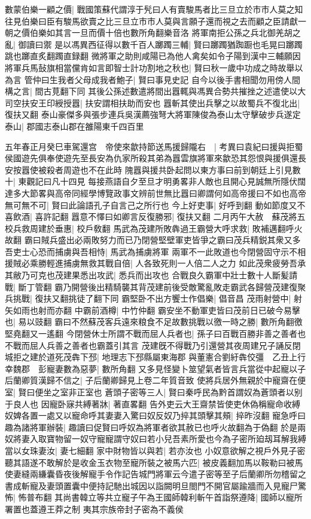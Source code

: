 數蒙伯樂一顧之價|{
	戰國策蘇代謂淳于髠曰人有賣駿馬者比三旦立於市市人莫之知往見伯樂曰臣有駿馬欲賣之比三旦立市市人莫與言願子還而視之去而顧之臣請獻一朝之價伯樂如其言一旦而價十倍也數所角翻樂音洛}
將軍南拒公孫之兵北御羌胡之亂|{
	御讀曰禦}
是以馮異西征得以數千百人躑躅三輔|{
	賢曰躑躅猶踟蹰也毛晃曰躑躅跳也躑直炙翻躅直録翻}
微將軍之助則咸陽已為他人禽矣如令子陽到漢中三輔願因將軍兵馬鼔旗相當儻肯如言即智士計功割地之秋也|{
	賢曰秋一歲中功成之時故舉以為言}
管仲曰生我者父母成我者鮑子|{
	賢曰事見史記}
自今以後手書相聞勿用傍人間構之言|{
	間古莧翻下同}
其後公孫述數遣將間出囂輒與馮異合勢共摧挫之述遣使以大司空扶安王印綬授囂|{
	扶安謂相扶助而安也}
囂斬其使出兵擊之以故蜀兵不復北出|{
	復扶又翻}
泰山豪傑多與張步連兵吳漢薦強弩大將軍陳俊為泰山太守擊破步兵遂定泰山|{
	郡國志泰山郡在雒陽東千四百里}


五年春正月癸巳車駕還宫　帝使來歙持節送馬援歸隴右　|{
	考異曰袁紀曰援與拒蜀侯國遊先俱奉使遊先至長安為仇家所殺其弟為囂雲旗將軍來歙恐其怨恨與援俱還長安按囂使被殺者周遊也不在此時}
隗囂與援共卧起問以東方事曰前到朝廷上引見數十|{
	東觀記曰凡十四見}
每接燕語自夕至旦才明勇畧非人敵也且開心見誠無所隱伏闊達多大節畧與高帝同經學博覽政事文辨前世無比囂曰卿謂何如高帝援曰不如也高帝無可無不可|{
	賢曰此論語孔子自言己之所行也}
今上好吏事|{
	好呼到翻}
動如節度又不喜飲酒|{
	喜許記翻}
囂意不懌曰如卿言反復勝邪|{
	復扶又翻}
二月丙午大赦　蘇茂將五校兵救周建於垂惠|{
	校戶敎翻}
馬武為茂建所敗犇過王霸營大呼求救|{
	敗補邁翻呼火故翻}
霸曰賊兵盛出必兩敗努力而已乃閉營堅壁軍吏皆爭之霸曰茂兵精鋭其衆又多吾吏士心恐而捕虜與吾相恃|{
	馬武為捕虜將軍}
兩軍不一此敗道也今閉營固守示不相援賊必乘勝輕進捕虜無救其戰自倍|{
	人各致死則一人倍二人之力}
如此茂衆疲勞吾承其敝乃可克也茂建果悉出攻武|{
	悉兵而出攻也}
合戰良久霸軍中壯士數十人斷髪請戰|{
	斷丁管翻}
霸乃開營後出精騎襲其背茂建前後受敵驚亂敗走霸武各歸營茂建復聚兵挑戰|{
	復扶又翻挑徒了翻下同}
霸堅卧不出方饗士作倡樂|{
	倡音昌}
茂雨射營中|{
	射矢如雨也射而亦翻}
中霸前酒樽|{
	中竹仲翻}
霸安坐不動軍吏皆曰茂前日已破今易擊也|{
	易以豉翻}
霸曰不然蘇茂客兵遠來粮食不足故數挑戰以徼一時之勝|{
	數所角翻徼堅堯翻又一遙翻}
今閉營休士所謂不戰而屈人兵者也|{
	孫子曰百戰百勝非善之善者也不戰而屈人兵善之善者也霸蓋引其言}
茂建旣不得戰乃引還營其夜周建兄子誦反閉城拒之建於道死茂犇下邳|{
	地理志下邳縣屬東海郡}
與董憲合劉紆犇佼彊　乙丑上行幸魏郡　彭寵妻數為惡夢|{
	數所角翻}
又多見怪變卜筮望氣者皆言兵當從中起寵以子后蘭卿質漢歸不信之|{
	子后蘭卿歸見上卷二年質音致}
使將兵居外無親於中寵齋在便室|{
	賢曰便坐之室非正室也}
蒼頭子密等三人|{
	賢曰秦呼民為黔首謂奴為蒼頭者以别于良人也}
因寵卧寐共縛著牀|{
	著直畧翻}
告外吏云大王齋禁皆使吏休偽稱寵命收縛奴婢各置一處又以寵命呼其妻妻入驚曰奴反奴乃捽其頭擊其頰|{
	捽昨沒翻}
寵急呼曰趣為諸將軍辦裝|{
	趣讀曰促賢曰呼奴為將軍者欲其赦已也呼火故翻為于偽翻}
於是兩奴將妻入取寶物留一奴守寵寵謂守奴曰若小兒吾素所愛也今為子密所廹刼耳解我縛當以女珠妻汝|{
	妻七細翻}
家中財物皆以與若|{
	若亦汝也}
小奴意欲解之視戶外見子密聽其語遂不敢解於是收金玉衣物至寵所裝之被馬六匹|{
	被皮義翻加馬以鞍勒曰被馬}
使妻縫兩縑囊昏夜後解寵手令作記告城門將軍云今遣子密等至子后蘭卿所勿稽留之書成斬寵及妻頭置囊中便持記馳出城因以詣闕明旦閤門不開官屬踰牆而入見寵尸驚怖|{
	怖普布翻}
其尚書韓立等共立寵子午為王國師韓利斬午首詣祭遵降|{
	國師以寵所署置也蓋遵王莽之制}
夷其宗族帝封子密為不義侯

